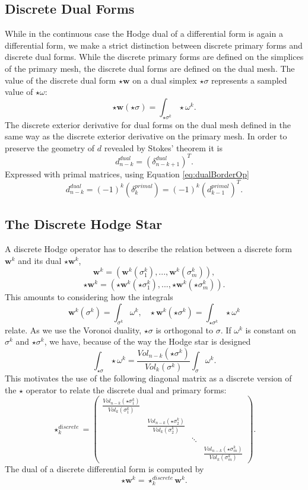 \subsection{Discrete Dual Forms}
While in the continuous case the Hodge dual of a differential form is again a differential form, we make a strict distinction between discrete primary forms and discrete dual forms. While the discrete primary forms are defined on the simplices of the primary mesh, the discrete dual forms are defined on the dual mesh.
The value of the discrete dual form $\star \textbf{w}$ on a dual simplex $\star \sigma$ represents a sampled value of $\star \omega$:
\begin{equation}\star \textbf{w}(\star \sigma) = \int_{\star \sigma^k}  \star \omega^k. \label{eq:dualSampling}\end{equation}
The discrete exterior derivative for dual forms on the dual mesh defined in the same way as the discrete exterior derivative on the primary mesh. In order to preserve the geometry of $d$ revealed by Stokes' theorem it is
\[d^{dual}_{n-k} = (\delta^{dual}_{n-k+1})^T. \]
Expressed with primal matrices, using Equation \ref{eq:dualBorderOp}
\begin{equation}d^{dual}_{n-k}= (-1)^k(\delta_k^{primal}) = (-1)^k(d^{primal}_{k-1})^T. \label{eq:dualDerivative}\end{equation}


\subsection{The Discrete Hodge Star}

A discrete Hodge operator has to describe the relation between a discrete form $\textbf{w}^k$ and its dual $\star \textbf{w}^k$, 
\[\textbf{w}^k = (\textbf{w}^k(\sigma^k_1),...,\textbf{w}^k(\sigma^k_m)),\]
\[\star\textbf{w}^k  = (\star\textbf{w}^k(\star\sigma^k_1),...,\star\textbf{w}^k(\star\sigma^k_m)).\]
This amounts to considering how the integrals
\[\textbf{w}^k(\sigma^k) =\int_{\sigma^k} \omega^k ,\;\;\; \star\textbf{w}^k(\star\sigma^k) = \int_{\star \sigma^k} \star \omega^k\]
relate. As we use the Voronoi duality, $\star \sigma$ is orthogonal to $\sigma$. If $\omega^k$ is constant on $\sigma^k$ and $\star \sigma^k$, we have, because of the way the Hodge star is designed
\[\int_{\star\sigma} \star\omega^k =  \frac{Vol_{n-k}(\star \sigma^k)}{Vol_k(\sigma^k)}\int_{\sigma} \omega^k.\]
This motivates the use of the following diagonal matrix as a discrete version of the $\star$ operator to relate the discrete dual and primary forms:
\[\star^{discrete}_k = \begin{pmatrix}
\frac{Vol_{n-k}(\star \sigma^k_1)}{Vol_k(\sigma_1^k)} \\
&\frac{Vol_{n-k}(\star \sigma_2^k)}{Vol_k(\sigma_2^k)} \\
& & \ddots \\
& & & \frac{Vol_{n-k}(\star \sigma_m^k)}{Vol_k(\sigma_m^k)}
\end{pmatrix}.\]
The dual of a discrete differential form is computed by
\[\star \textbf{w}^k = \star^{discrete}_k \textbf{w}^k.\]



